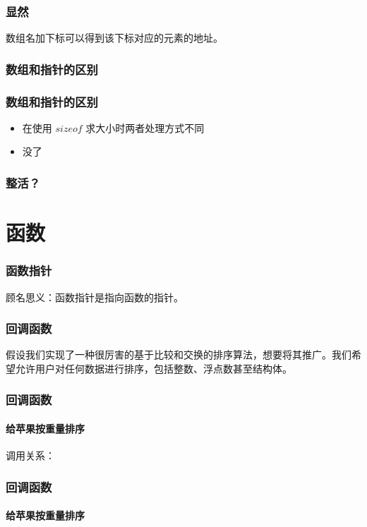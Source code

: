 \documentclass{beamer}
\begin{document}
\begin{frame}
 \frametitle{显然}

 数组名加下标可以得到该下标对应的元素的地址。

\end{frame}

\begin{frame}
 \frametitle{数组和指针的区别}
 
\end{frame}

\begin{frame}
 \frametitle{数组和指针的区别}
 \begin{itemize}
  \item 在使用 \(sizeof\) 求大小时两者处理方式不同
  \item 没了
 \end{itemize}
\end{frame}

\begin{frame}
 \frametitle{整活？}
 
\end{frame}

\section{函数}
\begin{frame}
 \frametitle{函数指针}
 顾名思义：函数指针是指向函数的指针。
 
\end{frame}

\begin{frame}
 \frametitle{回调函数}

 假设我们实现了一种很厉害的基于比较和交换的排序算法，想要将其推广。我们希望允许用户对任何数据进行排序，包括整数、浮点数甚至结构体。

\end{frame}

\begin{frame}
 \frametitle{回调函数}
 \framesubtitle{给苹果按重量排序}

 调用关系：

\end{frame}

\begin{frame}
 \frametitle{回调函数}
 \framesubtitle{给苹果按重量排序}

 
\end{frame}
\end{document}

